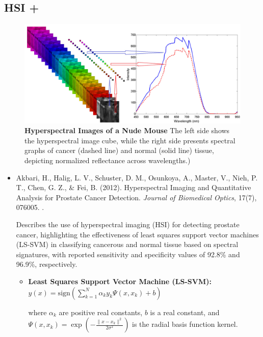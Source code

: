 \documentclass[10pt,svgnames,fragile]{beamer}
\begin{document}
\subsection{HSI + }
\begin{frame}{}
\tiny
\vspace{-0.18cm}
\begin{figure}
    \centering
    \includegraphics[width=0.61\linewidth]{akabari_figure.png}
    \caption{\textbf{Hyperspectral Images of a Nude Mouse} The left side shows the hyperspectral image cube, while the right side presents spectral graphs of cancer (dashed line) and normal (solid line) tissue, depicting normalized reflectance across wavelengths.)\cite{akbariHyperspectralImagingQuantitative2012}}
    \label{fig:akabari_figure}
\end{figure}
\vspace{-0.3cm}
\begin{itemize}
    \item Akbari, H., Halig, L. V., Schuster, D. M., Osunkoya, A., Master, V., Nieh, P. T., Chen, G. Z., \& Fei, B. (2012). Hyperspectral Imaging and Quantitative Analysis for Prostate Cancer Detection. \textit{Journal of Biomedical Optics}, 17(7), 076005. \href{https://doi.org/10.1117/1.JBO.17.7.076005}{\color{blue}{DOI: 10.1117/1.JBO.17.7.076005}}. \cite{akbariHyperspectralImagingQuantitative2012}
    
    {\color{gray}Describes the use of hyperspectral imaging (HSI) for detecting prostate cancer, highlighting the effectiveness of least squares support vector machines (LS-SVM) in classifying cancerous and normal tissue based on spectral signatures, with reported sensitivity and specificity values of 92.8\% and 96.9\%, respectively.}
    \begin{itemize} \tiny
    \item \textbf{Least Squares Support Vector Machine (LS-SVM):}
    \(
    y(x) = \text{sign} \left( \sum_{k=1}^{N} \alpha_k y_k \Psi(x, x_k) + b \right)
    \)
    
    where \( \alpha_k \) are positive real constants, \( b \) is a real constant, and \( \Psi(x, x_k) = \exp \left( -\frac{\| x - x_k \|^2}{2\sigma^2} \right) \) is the radial basis function kernel.


\end{itemize}
\end{itemize}
\end{frame}
\end{document}

